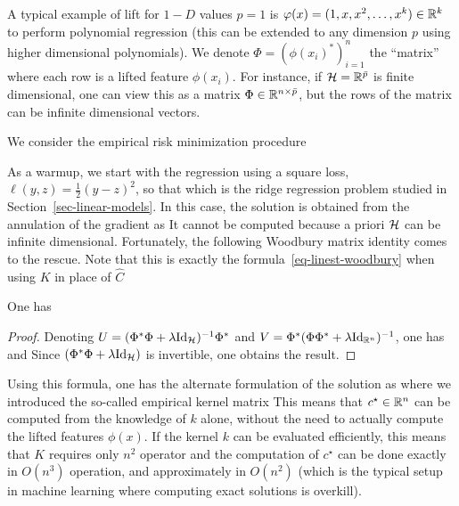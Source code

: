 A typical example of lift for $1-D$ values $p=1$ is $\varphi(x) = (1,x,x^2,\ldots,x^k) \in \mathbb{R}^k$ to perform polynomial regression (this can be extended to any dimension $p$ using higher dimensional polynomials).
%
We denote $\Phi = ( \phi(x_i)^* )_{i=1}^n$ the ``matrix'' where each row is a lifted feature $\phi(x_i)$. For instance, if $\mathcal{H}=\mathbb{R}^{\bar p}$ is finite dimensional, one can view this as a matrix $\Phi \in \mathbb{R}^{n \times \bar p}$, but the rows of the matrix can be infinite dimensional vectors.

We consider the empirical risk minimization procedure 

As a warmup, we start with the regression using a square loss, $\ell(y,z)=\frac{1}{2}(y-z)^2$, so that 
which is the ridge regression problem studied in Section~\ref{sec-linear-models}. 
%
In this case, the solution is obtained from the annulation of the gradient as
It cannot be computed because a priori $\mathcal{H}$ can be infinite dimensional. Fortunately, the following Woodbury matrix identity comes to the rescue.
%
Note that this is exactly the formula~\eqref{eq-linest-woodbury} when using $K$ in place of $\hat C$

\begin{prop}
	One has
\end{prop}
\begin{proof}
	Denoting $U=( \Phi^*\Phi + \lambda \mathrm{Id}_{\mathcal{H}} )^{-1} \Phi^*$ and $V=\Phi^* ( \Phi \Phi^* + \lambda \mathrm{Id}_{\mathbb{R}^n} )^{-1}$, one has
	and
	Since $( \Phi^*\Phi + \lambda \mathrm{Id}_{\mathcal{H}} )$ is invertible, one obtains the result. 
\end{proof}

Using this formula, one has the alternate formulation of the solution as
where we introduced the so-called empirical kernel matrix
This means that $c^\star \in \mathbb{R}^n$ can be computed from the knowledge of $k$ alone, without the need to actually compute the lifted features $\phi(x)$. If the kernel $k$ can be evaluated efficiently, this means that $K$ requires only $n^2$ operator and the computation of $c^\star$ can be done exactly in $O(n^3)$ operation, and approximately in $O(n^2)$ (which is the typical setup in machine learning where computing exact solutions is overkill). 

